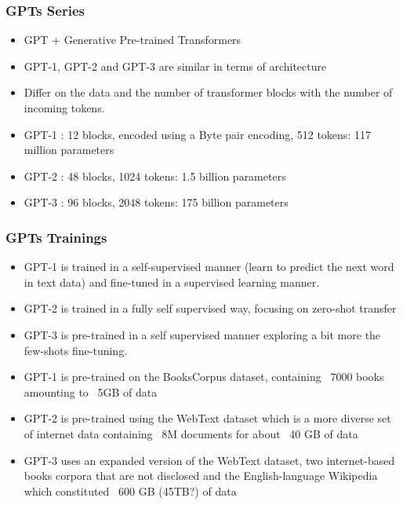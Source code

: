 \begin{frame}[fragile]\frametitle{GPTs Series}


\begin{itemize}
\item GPT + Generative Pre-trained Transformers
\item GPT-1, GPT-2 and GPT-3 are similar in terms of architecture 
\item Differ on the data and the number of transformer blocks with the number of incoming tokens.   
\item GPT-1 : 12 blocks, encoded using a Byte pair encoding, 512 tokens: 117 million parameters 
\item GPT-2 : 48 blocks, 1024 tokens: 1.5 billion parameters 
\item GPT-3 : 96 blocks, 2048 tokens: 175 billion parameters 
\end{itemize}	 

\end{frame}

\begin{frame}[fragile]\frametitle{GPTs Trainings}


\begin{itemize}
\item GPT-1 is trained in a self-supervised manner (learn to predict the next word in text data) and fine-tuned in a supervised learning manner. 
\item GPT-2 is trained in a fully self supervised way, focusing on zero-shot transfer
\item  GPT-3 is pre-trained in a self supervised manner exploring a bit more the few-shots fine-tuning.
\item GPT-1 is pre-trained on the BooksCorpus dataset, containing ~7000 books amounting to ~5GB of data
\item GPT-2 is pre-trained using the WebText dataset which is a more diverse set of internet data containing ~8M documents for about ~40 GB of data
\item GPT-3 uses an expanded version of the WebText dataset, two internet-based books corpora that are not disclosed and the English-language Wikipedia which constituted ~600 GB (45TB?) of data
\end{itemize}	 

\end{frame}



